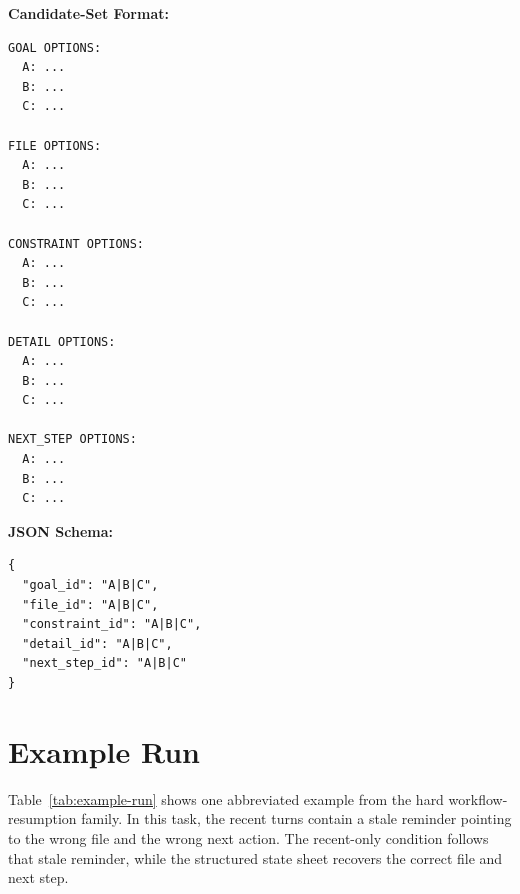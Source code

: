 \documentclass[11pt]{article}
\begin{document}
\textbf{Candidate-Set Format:}
{\footnotesize
\begin{verbatim}
GOAL OPTIONS:
  A: ...
  B: ...
  C: ...

FILE OPTIONS:
  A: ...
  B: ...
  C: ...

CONSTRAINT OPTIONS:
  A: ...
  B: ...
  C: ...

DETAIL OPTIONS:
  A: ...
  B: ...
  C: ...

NEXT_STEP OPTIONS:
  A: ...
  B: ...
  C: ...
\end{verbatim}
}

\textbf{JSON Schema:}
{\footnotesize
\begin{verbatim}
{
  "goal_id": "A|B|C",
  "file_id": "A|B|C",
  "constraint_id": "A|B|C",
  "detail_id": "A|B|C",
  "next_step_id": "A|B|C"
}
\end{verbatim}
}

\section{Example Run}
\label{sec:appendix_example}
Table~\ref{tab:example-run} shows one abbreviated example from the hard workflow-resumption family. In this task, the recent turns contain a stale reminder pointing to the wrong file and the wrong next action. The recent-only condition follows that stale reminder, while the structured state sheet recovers the correct file and next step.

\begin{table}[t]
\centering
\small
{}
\caption{Abbreviated example from task \texttt{ns01\_hard}. The structured state sheet overrides the misleading recent reminder, while recent-only truncation follows it.}
\label{tab:example-run}
\end{table}
\end{document}
